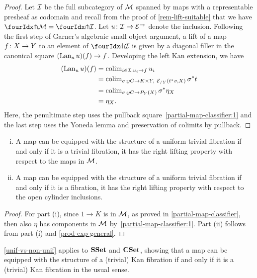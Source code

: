 \documentclass[reqno,10pt,a4paper,oneside,draft]{amsart}
\begin{document}
{{\begin{proof}
Let $\cal{I}$ be the full subcategory of $\cal{M}$ spanned by maps with a representable presheaf as codomain
and recall from the proof of \cref{rem-lift-suitable} that we have $\liftr{\cal{M}} = \liftr{\cal{I}}$.
Let $u \co \cal{I} \to \cal{E}^\to$ denote the inclusion.
Following the first step of Garner's algebraic small object argument, a lift of a map $f \co X \to Y$ to an element of $\liftr{\cal{I}}$ is given by a diagonal filler in the canonical square $(\Lan_u u)(f) \to f$.
Developing the left Kan extension, we have
\begin{align*}
(\Lan_u u)(f)
&=
\colim_{i \in \cal{I}, u_i \to f} u_i
\\&=
\colim_{\sigma : y C \to K \times Y,\ \cal{E}_{/Y}(t^* \sigma, X)} \sigma^* t
\\&=
\colim_{\sigma : y C \to P_Y(X)} \sigma^* \eta_X
\\&=
\eta_X
.
\end{align*}
Here, the penultimate step uses the pullback square~\eqref{partial-map-classifier:1} and the last step uses the Yoneda lemma and preservation of colimits by pullback.
\end{proof}

\begin{theorem} \label{unif-vs-non-unif} \leavevmode
\begin{enumerate}[(i)]
\item A map can be equipped with the structure of a uniform trivial fibration if and only if it is a trivial fibration, \ie it has
the right lifting property with respect to the maps in $\cal{M}$.
\item A map can be equipped with the structure of a uniform trivial fibration if and only if it is a fibration, \ie it has the right
lifting property with respect to the open cylinder inclusions.
\end{enumerate}
\end{theorem}

\begin{proof}
For part (i), since $1 \to K$ is in $\cal{M}$, as proved in \cref{partial-map-classifier}, then also $\eta$ has components in $\cal{M}$ by~\eqref{partial-map-classifier:1}.
Part (ii) follows from part (i) and \cref{prod-exp-general}.
\end{proof}

\begin{example} \label{elegant-reedy}
\cref{unif-vs-non-unif} applies to $\SSet$ and $\CSet$, showing that a map can be equipped with the structure of a (trivial) Kan fibration if and only if it is a (trivial) Kan fibration in the usual sense.
\end{example}

}}
\end{document}
